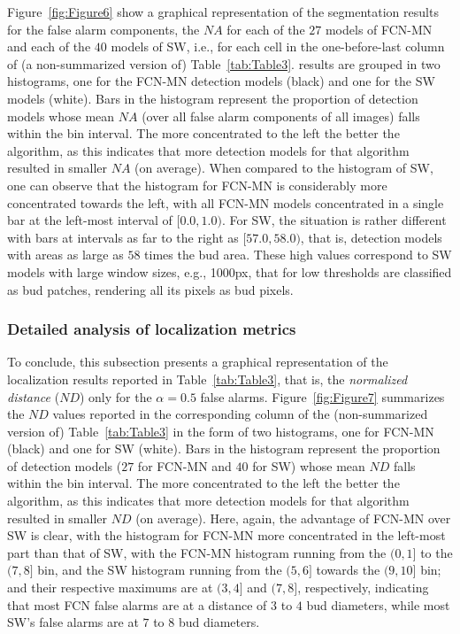 \documentclass[a4paper,authoryear,review]{elsarticle}
\begin{document}
	
	Figure~\ref{fig:Figure6} show a graphical representation of the segmentation results for the false alarm components, the $NA$ for each of the $27$ models of FCN-MN and each of the $40$ models of SW, i.e., for each cell in the one-before-last column of (a non-summarized version of) Table~\ref{tab:Table3}. results are grouped in two histograms, one for the FCN-MN detection models (black) and one for the SW models (white). Bars in the histogram represent the proportion of detection models whose mean $NA$ (over all false alarm components of all images) falls within the bin interval. The more concentrated to the left the better the algorithm, as this indicates that more detection models for that algorithm resulted in smaller $NA$ (on average). When compared to the histogram of SW, one can observe that the histogram for FCN-MN is considerably more concentrated towards the left, with all FCN-MN models concentrated in a single bar at the left-most interval of $[0.0, 1.0)$. For SW, the situation is rather different with bars at intervals as far to the right as $[57.0, 58.0)$, that is, detection models with areas as large as $58$ times the bud area. These high values correspond to SW models with large window sizes, e.g., 1000px, that for low thresholds are classified as bud patches, rendering all its pixels as bud pixels.
	
	\subsubsection{Detailed analysis of localization metrics}
	
	To conclude, this subsection presents a graphical representation of the localization results reported in Table~\ref{tab:Table3}, that is, the \emph{normalized distance} ($ND$) only for the $\alpha=0.5$ false alarms. 
	Figure~\ref{fig:Figure7} summarizes the $ND$ values reported in the corresponding column of the (non-summarized version of) Table~\ref{tab:Table3} in the form of two histograms, one for FCN-MN (black) and one for SW (white). Bars in the histogram represent the proportion of detection models ($27$ for FCN-MN and $40$ for SW) whose mean $ND$ falls within the bin interval. The more concentrated to the left the better the algorithm, as this indicates that more detection models for that algorithm resulted in smaller $ND$ (on average).
	Here, again, the advantage of FCN-MN over SW is clear, with the histogram for FCN-MN more concentrated in the left-most part than that of SW, with the FCN-MN histogram running from the $(0,1]$ to the $(7,8]$ bin, and the SW histogram running from the $(5,6]$ towards the $(9,10]$ bin; and their respective maximums are at $(3,4]$ and $(7,8]$, respectively, indicating that most FCN false alarms are at a distance of $3$ to $4$ bud diameters, while most SW’s false alarms are at $7$ to $8$ bud diameters. 
	
\end{document}
